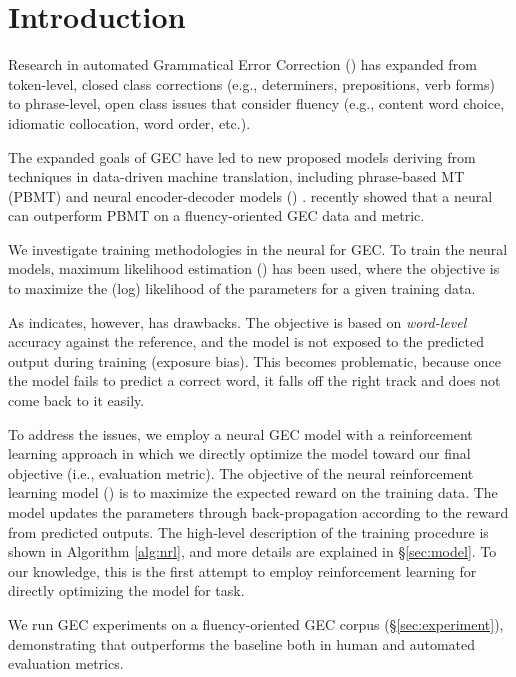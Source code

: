 \section{Introduction}
Research in automated Grammatical Error Correction (\gec) has expanded  from token-level, closed class corrections (e.g., determiners, prepositions, verb forms) to phrase-level, open class issues that consider fluency (e.g., content word choice, idiomatic collocation, word order, etc.).

The expanded goals of GEC have led to new proposed models deriving from techniques in data-driven machine translation, including phrase-based MT (PBMT) \cite{felice-EtAl:2014:W14-17,chollampatt-hoang-ng:2016:EMNLP2016,junczysdowmunt-grundkiewicz:2016:EMNLP2016} and neural encoder-decoder models (\encdec) \cite{yuan-briscoe:2016:N16-1}.
 recently showed that a neural \encdec can outperform PBMT on a fluency-oriented GEC data and metric.

We investigate training methodologies in the neural \encdec for GEC.
To train the neural \encdec models, maximum likelihood estimation (\mle) has been used, where the objective is to maximize the (log) likelihood of the parameters for a given training data.

\newlength{\textfloatsepsave}
\setlength{\textfloatsepsave}{\textfloatsep} \setlength{\textfloatsep}{0pt}

As  indicates, however, \mle has drawbacks.
The \mle objective is based on {\em word-level} accuracy against the reference, and the model is not exposed to the predicted output during training (exposure bias).
This becomes problematic, because once the model fails to predict a correct word, it falls off the right track and does not come back to it easily.

To address the issues, we employ a neural \encdec GEC model with a reinforcement learning approach in which we directly optimize the model toward our final objective (i.e., evaluation metric).
The objective of the neural reinforcement learning model (\proposed) is to maximize the expected reward on the training data.
The model updates the parameters through back-propagation according to the reward from predicted outputs. 
The high-level description of the training procedure is shown in Algorithm \ref{alg:nrl},
and more details are explained in \S\ref{sec:model}.
To our knowledge, this is the first attempt to employ reinforcement learning for directly optimizing the \encdec model for \gec task.

We run GEC experiments on a fluency-oriented GEC corpus (\S\ref{sec:experiment}), demonstrating that \proposed outperforms the \mle baseline both in human and automated evaluation metrics.

